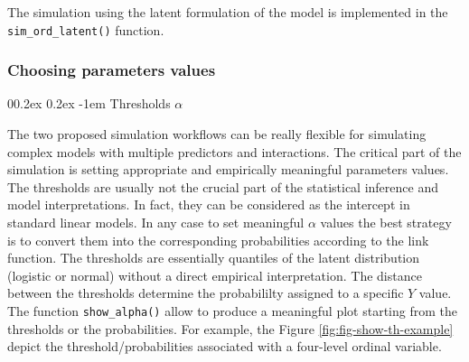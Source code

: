 \documentclass[
  man,floatsintext]{apa6}
\makeatletter
\newenvironment{Shaded}{\begin{snugshade}}{\end{snugshade}}
\let\oldparagraph\paragraph
\renewcommand{\paragraph}[1]{\oldparagraph{#1}\mbox{}}
\renewcommand{\paragraph}{\@startsection{paragraph}{4}{\parindent}%
  {0\baselineskip \@plus 0.2ex \@minus 0.2ex}%
  {-1em}%
  {\normalfont\normalsize\bfseries\itshape\typesectitle}}
\makeatother
\begin{document}
\normalsize

\scriptsize

\normalsize

\scriptsize

\normalsize

The simulation using the latent formulation of the model is implemented in the \texttt{sim\_ord\_latent()} function.

\scriptsize

\begin{Shaded}
\begin{Highlighting}[]

\end{Highlighting}
\end{Shaded}

\normalsize

\subsubsection{Choosing parameters values}\label{choosing-parameters-values}

\paragraph{\texorpdfstring{Thresholds \(\alpha\)}{Thresholds \textbackslash alpha}}\label{thresholds-alpha}

The two proposed simulation workflows can be really flexible for simulating complex models with multiple predictors and interactions. The critical part of the simulation is setting appropriate and empirically meaningful parameters values. The thresholds are usually not the crucial part of the statistical inference and model interpretations. In fact, they can be considered as the intercept in standard linear models. In any case to set meaningful \(\alpha\) values the best strategy is to convert them into the corresponding probabilities according to the link function. The thresholds are essentially quantiles of the latent distribution (logistic or normal) without a direct empirical interpretation. The distance between the thresholds determine the probabililty assigned to a specific \(Y\) value. The function \texttt{show\_alpha()} allow to produce a meaningful plot starting from the thresholds or the probabilities. For example, the Figure \ref{fig:fig-show-th-example} depict the threshold/probabilities associated with a four-level ordinal variable.

\scriptsize

\normalsize
\end{document}
